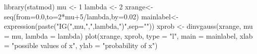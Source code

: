 \begin{Schunk}
\begin{Sinput}
 library(statmod)
 mu <- 1
 lambda <- 2
 xrange<- seq(from=0.0,to=2*mu+5/lambda,by=0.02)
 mainlabel<- expression(paste("IG(",mu,",",lambda,")",sep=""))
 xprob <- dinvgauss(xrange, mu = mu, lambda = lambda)
 plot(xrange, xprob, type = "l", main = mainlabel, xlab = "possible values of x", ylab = "probability of x")
 
\end{Sinput}
\end{Schunk}
